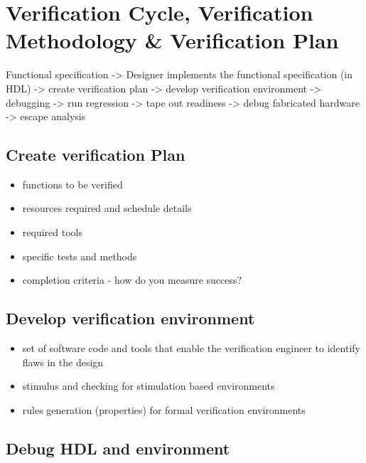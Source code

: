 \documentclass[]{article}
\date{}
\providecommand{\tightlist}{%
  \setlength{\itemsep}{0pt}\setlength{\parskip}{0pt}}
\begin{document}
\hypertarget{verification-cycle-verification-methodology-verification-plan}{%
\section{Verification Cycle, Verification Methodology \& Verification
Plan}\label{verification-cycle-verification-methodology-verification-plan}}

Functional specification -\textgreater{} Designer implements the
functional specification (in HDL) -\textgreater{} create verification
plan -\textgreater{} develop verification environment -\textgreater{}
debugging -\textgreater{} run regression -\textgreater{} tape out
readiness -\textgreater{} debug fabricated hardware -\textgreater{}
escape analysis

\hypertarget{create-verification-plan}{%
\subsection{Create verification Plan}\label{create-verification-plan}}

\begin{itemize}
\tightlist
\item
  functions to be verified
\item
  resources required and schedule details
\item
  required tools
\item
  specific tests and methods
\item
  completion criteria - how do you measure success?
\end{itemize}

\hypertarget{develop-verification-environment}{%
\subsection{Develop verification
environment}\label{develop-verification-environment}}

\begin{itemize}
\tightlist
\item
  set of software code and tools that enable the verification engineer
  to identify flaws in the design
\item
  stimulus and checking for stimulation based environments
\item
  rules generation (properties) for formal verification environments
\end{itemize}

\hypertarget{debug-hdl-and-environment}{%
\subsection{Debug HDL and environment}\label{debug-hdl-and-environment}}
\end{document}
